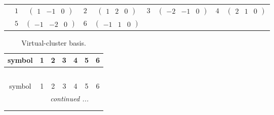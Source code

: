 \documentclass[fleqn,10pt,landscape]{article}
\begin{document}
\begin{itemize}
{\begin{center}
\begin{longtable}{ccccccccc}
 & $ 1 $ & $ \begin{pmatrix} 1 & -1 & 0 \end{pmatrix} $ & $ 2 $ & $ \begin{pmatrix} 1 & 2 & 0 \end{pmatrix} $ & $ 3 $ & $ \begin{pmatrix} -2 & -1 & 0 \end{pmatrix} $ & $ 4 $ & $ \begin{pmatrix} 2 & 1 & 0 \end{pmatrix} $ \\
& $ 5 $ & $ \begin{pmatrix} -1 & -2 & 0 \end{pmatrix} $ & $ 6 $ & $ \begin{pmatrix} -1 & 1 & 0 \end{pmatrix} $ & $  $ & $  $ & $  $ & $  $ \\
\end{longtable}
\end{center}
\begin{center}
\renewcommand{\arraystretch}{1.7}
\begin{longtable}{ccccccc}
\caption{Virtual-cluster basis.}
 \\
 \hline \hline
symbol & 1 & 2 & 3 & 4 & 5 & 6 \\ \hline \endfirsthead

\multicolumn{6}{l}{\tablename\ \thetable{}} \\
 \hline \hline
symbol & 1 & 2 & 3 & 4 & 5 & 6 \\ \hline \endhead

 \hline \hline
\multicolumn{6}{r}{\footnotesize\it continued ...} \\ \endfoot

 \hline \hline
\multicolumn{6}{r}{} \\ \endlastfoot


\end{longtable}
\end{center}}
\end{itemize}
\end{document}
